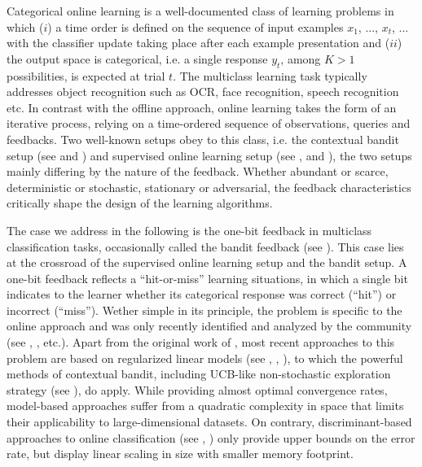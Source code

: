 \documentclass[preprint,12pt,authoryear]{elsarticle}
\begin{document}
Categorical online learning is a well-documented class of learning problems in which ($i$) a time order is defined on the sequence of input examples  $x_1$, ..., $x_t$, ... with the classifier update taking place after each example presentation and ($ii$) the output space is categorical, i.e. a single response $y_t$, among $K>1$ possibilities, is expected at trial $t$. The multiclass learning task typically addresses object recognition such as OCR, face recognition, speech recognition etc. In contrast with the offline approach, online learning takes the form of an iterative process, relying on a time-ordered sequence of observations, queries and feedbacks.   
Two well-known setups obey to this class, i.e. the contextual bandit setup (see  \cite{lai1985asymptotically} and \cite{auer2002finite}) and supervised online learning setup (see  \cite{rosenblatt1958perceptron}, \cite{duda1973pattern} and \cite{freund1999large}), the two setups mainly differing by the nature of the feedback. Whether abundant or scarce, deterministic or stochastic, stationary or adversarial, the feedback characteristics critically shape the design of the learning algorithms.  

The case we address in the following is the one-bit feedback in multiclass classification tasks, occasionally called the bandit feedback (see \cite{kakade2008efficient}). This case lies at the crossroad of the supervised online learning setup and the bandit setup.  A one-bit feedback reflects a ``hit-or-miss'' learning situations, in which a single bit indicates to the learner whether its categorical response was correct (``hit'') or incorrect (``miss''). Wether simple in its principle, the problem is specific to the online approach and was only recently identified and analyzed by the community (see \cite{kakade2008efficient}, \cite{gentile2012multilabel}, etc.). 
Apart from the original work of \cite{kakade2008efficient}, most recent approaches to this problem are based on regularized linear models (see \cite{li2010contextual}, \cite{crammer2013multiclass}, \cite{ngo2013upper}), to which the powerful methods of contextual bandit, including UCB-like non-stochastic exploration strategy (see \cite{lai1985asymptotically}), do apply. While providing almost optimal convergence rates, model-based approaches suffer from a quadratic complexity in space that limits their applicability to large-dimensional datasets.  On contrary, discriminant-based approaches to online classification (see \cite{anlauf1989adatron}, \cite{crammer2006online}) only provide upper bounds on the error rate, but display linear scaling in size with smaller memory footprint. 
\end{document}

